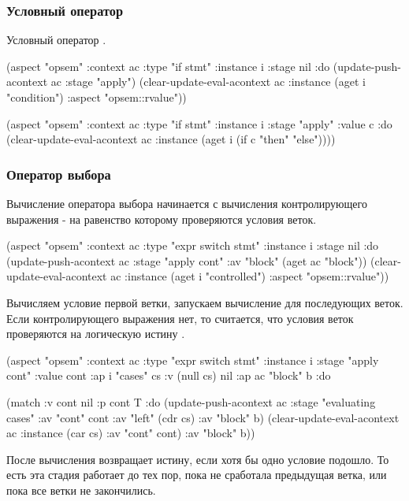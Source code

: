 \documentclass[12pt,twoside,russian]{article}
\newcommand{\textGoKeyword}[1]{{\color{goPurple}\textbf{#1}}}
\newcommand{\textABMLString}[1]{{\color{abmlString}#1}}
\newcommand{\GoKeyword}[1]{\goinline{\textGoKeyword{#1}}}
\newcommand{\ABMLString}[1]{\abmlinline{\textABMLString{#1}}}
\begin{document}
\subsubsection{Условный оператор}
Условный оператор \GoKeyword{if}.

\begin{ABMLCode}
(aspect "opsem" :context ac :type "if stmt" :instance i :stage nil :do 
  (update-push-acontext ac :stage "apply")
  (clear-update-eval-acontext ac :instance (aget i "condition") 
                                 :aspect "opsem::rvalue"))

(aspect "opsem" :context ac :type "if stmt" :instance i :stage "apply" 
  :value c :do 
  (clear-update-eval-acontext ac :instance (aget i (if c "then" "else"))))
\end{ABMLCode}


\subsubsection{Оператор выбора}
Вычисление оператора выбора \GoKeyword{switch} начинается с вычисления контролирующего выражения - на равенство которому проверяются условия веток. 

\begin{ABMLCode}
(aspect "opsem" :context ac :type "expr switch stmt" :instance i 
  :stage nil :do 
  (update-push-acontext ac :stage "apply cont" 
                           :av "block" (aget ac "block"))
  (clear-update-eval-acontext ac :instance (aget i "controlled") 
                                 :aspect "opsem::rvalue"))
\end{ABMLCode}

Вычисляем условие первой ветки, запускаем вычисление для последующих веток. Если контролирующего выражения нет, то считается, что условия веток проверяются на логическую истину \GoKeyword{true}.

\begin{ABMLCode}
(aspect "opsem" :context ac :type "expr switch stmt" :instance i 
  :stage "apply cont" :value cont :ap i "cases" cs 
  :v (null cs) nil :ap ac "block" b :do 
  
  (match :v cont nil :p cont T :do
    (update-push-acontext ac :stage "evaluating cases" :av "cont" cont 
      :av "left" (cdr cs) :av "block" b)
    (clear-update-eval-acontext ac :instance (car cs) :av "cont" cont) 
      :av "block" b))
\end{ABMLCode}

После вычисления \ABMLString{expr case clause} возвращает истину, если хотя бы одно условие подошло. То есть эта стадия работает до тех пор, пока не сработала предыдущая ветка, или пока все ветки не закончились.
\end{document}
